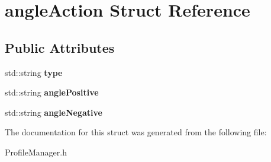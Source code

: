 \hypertarget{structangle_action}{\section{angle\+Action Struct Reference}
\label{structangle_action}
}
\subsection*{Public Attributes}
\begin{DoxyCompactItemize}
\item 
\hypertarget{structangle_action_a80155f045a94906eeb7d24be1943f899}{std\+::string {\bfseries type}}\label{structangle_action_a80155f045a94906eeb7d24be1943f899}

\item 
\hypertarget{structangle_action_ab8eaec2f161e6de2a9b7a9ef11db6758}{std\+::string {\bfseries angle\+Positive}}\label{structangle_action_ab8eaec2f161e6de2a9b7a9ef11db6758}

\item 
\hypertarget{structangle_action_a0bb049dc951d7a76e2cb315a8d926ecb}{std\+::string {\bfseries angle\+Negative}}\label{structangle_action_a0bb049dc951d7a76e2cb315a8d926ecb}

\end{DoxyCompactItemize}


The documentation for this struct was generated from the following file\+:\begin{DoxyCompactItemize}
\item 
Profile\+Manager.\+h\end{DoxyCompactItemize}
